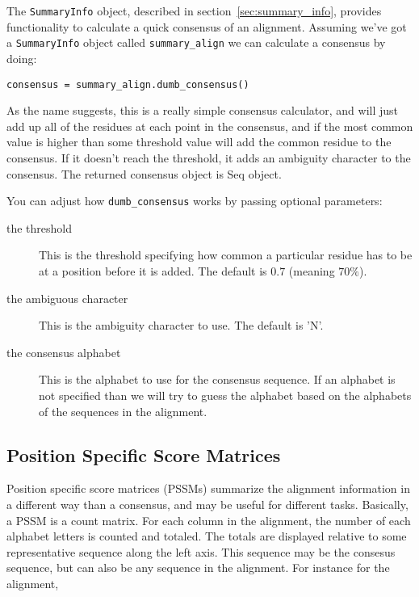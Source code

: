 The \verb|SummaryInfo| object, described in section~\ref{sec:summary_info}, provides functionality to calculate a quick consensus of an alignment. Assuming we've got a \verb|SummaryInfo| object called \verb|summary_align| we can calculate a consensus by doing:

\begin{verbatim}
consensus = summary_align.dumb_consensus()
\end{verbatim}

As the name suggests, this is a really simple consensus calculator, and will just add up all of the residues at each point in the consensus, and if the most common value is higher than some threshold value will add the common residue to the consensus. If it doesn't reach the threshold, it adds an ambiguity character to the consensus. The returned consensus object is Seq object.

You can adjust how \verb|dumb_consensus| works by passing optional parameters:

\begin{description}
\item[the threshold] This is the threshold specifying how common a particular residue has to be at a position before it is added. The default is $0.7$ (meaning $70\%$).

\item[the ambiguous character] This is the ambiguity character to use. The default is 'N'.

\item[the consensus alphabet] This is the alphabet to use for the consensus sequence. If an alphabet is not specified than we will try to guess the alphabet based on the alphabets of the sequences in the alignment.
\end{description}

\subsection{Position Specific Score Matrices}
\label{sec:pssm}

Position specific score matrices (PSSMs) summarize the alignment information in a different way than a consensus, and may be useful for different tasks. Basically, a PSSM is a count matrix. For each column in the alignment, the number of each alphabet letters is counted and totaled. The totals are displayed relative to some representative sequence along the left axis. This sequence may be the consesus sequence, but can also be any sequence in the alignment. For instance for the alignment,

